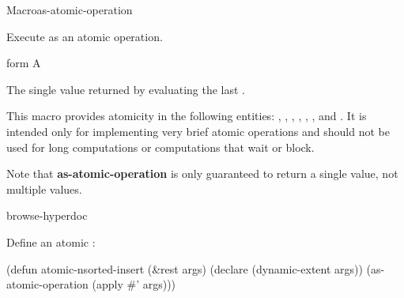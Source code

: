 \documentclass[10pt,twoside,english,pdftex]{article}
\begin{document}

\begin{functiondoc}{Macro}{as-atomic-operation}%
  {\superstar{} 
    \returns{} }

\fnsyntax

\fnpurpose Execute  as an atomic operation.

\fnpackage {}

\fnmodule {}

\fnargs
\begin{args}{form}
\arg[form] A 
\end{args}

\fnreturns The single value returned by evaluating the last .

\fndescription This macro provides atomicity in the following entities:
\textbf{}, \textbf{},
\textbf{}, \textbf{},
\textbf{}, \textbf{}, and
\textbf{}.  It is intended only for implementing very
brief atomic operations and should not be used for long computations or
computations that wait or block.

Note that \textbf{as-atomic-operation} is only guaranteed to return a single
value, not multiple values.

\begin{alsos}{browse-hyperdoc}
\end{alsos}

\fnexample
Define an atomic \textbf{}:
\begin{example}
  (defun atomic-nsorted-insert (\&rest args)
    (declare (dynamic-extent args))
    (as-atomic-operation (apply #' args)))
\end{example}

\end{functiondoc}

\end{document}
